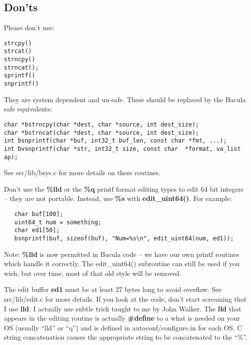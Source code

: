 \subsection{Don'ts}

Please don't use: 

\footnotesize
\begin{verbatim}
strcpy()
strcat()
strncpy()
strncat();
sprintf()
snprintf()
\end{verbatim}
\normalsize

They are system dependent and un-safe. These should be replaced by the Bacula
safe equivalents: 

\footnotesize
\begin{verbatim}
char *bstrncpy(char *dest, char *source, int dest_size);
char *bstrncat(char *dest, char *source, int dest_size);
int bsnprintf(char *buf, int32_t buf_len, const char *fmt, ...);
int bvsnprintf(char *str, int32_t size, const char  *format, va_list ap);
\end{verbatim}
\normalsize

See src/lib/bsys.c for more details on these routines. 

Don't use the {\bf \%lld} or the {\bf \%q} printf format editing types to edit
64 bit integers -- they are not portable. Instead, use {\bf \%s} with {\bf
edit\_uint64()}. For example: 

\footnotesize
\begin{verbatim}
   char buf[100];
   uint64_t num = something;
   char ed1[50];
   bsnprintf(buf, sizeof(buf), "Num=%s\n", edit_uint64(num, ed1));
\end{verbatim}
\normalsize

Note: {\bf \%lld} is now permitted in Bacula code -- we have our
own printf routines which handle it correctly. The edit\_uint64() subroutine
can still be used if you wish, but over time, most of that old style will
be removed.

The edit buffer {\bf ed1} must be at least 27 bytes long to avoid overflow.
See src/lib/edit.c for more details. If you look at the code, don't start
screaming that I use {\bf lld}. I actually use subtle trick taught to me by
John Walker. The {\bf lld} that appears in the editing routine is actually
{\bf \#define} to a what is needed on your OS (usually ``lld'' or ``q'') and
is defined in autoconf/configure.in for each OS. C string concatenation causes
the appropriate string to be concatenated to the ``\%''. 

